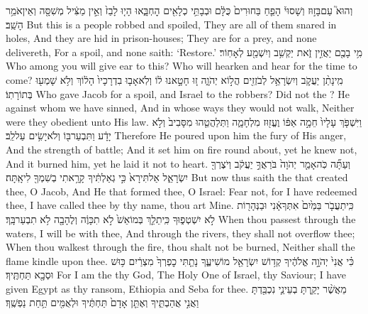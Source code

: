 {וְהוּא֮ עַם\maqqaf בָּז֣וּז וְשָׁסוּי֒ הָפֵ֤חַ בַּחוּרִים֙ כֻּלָּ֔ם וּבְבָתֵּ֥י כְלָאִ֖ים הׇחְבָּ֑אוּ הָי֤וּ לָבַז֙ וְאֵ֣ין מַצִּ֔יל מְשִׁסָּ֖ה וְאֵין\maqqaf אֹמֵ֥ר הָשַֽׁב׃}
{But this is a people robbed and spoiled, They are all of them snared in holes, And they are hid in prison-houses; They are for a prey, and none delivereth, For a spoil, and none saith: ‘Restore.’}
{מִ֥י בָכֶ֖ם יַאֲזִ֣ין זֹ֑את יַקְשִׁ֥ב וְיִשְׁמַ֖ע לְאָחֽוֹר׃}
{Who among you will give ear to this? Who will hearken and hear for the time to come?}
{מִֽי\maqqaf נָתַ֨ן  יַעֲקֹ֛ב וְיִשְׂרָאֵ֥ל לְבֹזְזִ֖ים הֲל֣וֹא יְהֹוָ֑ה ז֚וּ חָטָ֣אנוּ ל֔וֹ וְלֹֽא\maqqaf אָב֤וּ בִדְרָכָיו֙ הָל֔וֹךְ וְלֹ֥א שָׁמְע֖וּ בְּתוֹרָתֽוֹ׃}
{Who gave Jacob for a spoil, and Israel to the robbers? Did not the \lord? He against whom we have sinned, And in whose ways they would not walk, Neither were they obedient unto His law.}
{וַיִּשְׁפֹּ֤ךְ עָלָיו֙ חֵמָ֣ה אַפּ֔וֹ וֶעֱז֖וּז מִלְחָמָ֑ה וַתְּלַהֲטֵ֤הוּ מִסָּבִיב֙ וְלֹ֣א יָדָ֔ע וַתִּבְעַר\maqqaf בּ֖וֹ וְלֹא\maqqaf יָשִׂ֥ים עַל\maqqaf לֵֽב׃}
{Therefore He poured upon him the fury of His anger, And the strength of battle; And it set him on fire round about, yet he knew not, And it burned him, yet he laid it not to heart.}
\newperek
{}
{וְעַתָּ֞ה כֹּֽה\maqqaf אָמַ֤ר יְהֹוָה֙ בֹּרַאֲךָ֣ יַעֲקֹ֔ב וְיֹצֶרְךָ֖ יִשְׂרָאֵ֑ל אַל\maqqaf תִּירָא֙ כִּ֣י גְאַלְתִּ֔יךָ קָרָ֥אתִי בְשִׁמְךָ֖ לִי\maqqaf אָֽתָּה׃}
{But now thus saith the \lord\space that created thee, O Jacob, And He that formed thee, O Israel: Fear not, for I have redeemed thee, I have called thee by thy name, thou art Mine.}
{כִּֽי\maqqaf תַעֲבֹ֤ר בַּמַּ֙יִם֙ אִתְּךָ\maqqaf אָ֔נִי וּבַנְּהָר֖וֹת לֹ֣א יִשְׁטְפ֑וּךָ כִּֽי\maqqaf תֵלֵ֤ךְ בְּמוֹ\maqqaf אֵשׁ֙ לֹ֣א תִכָּוֶ֔ה וְלֶהָבָ֖ה לֹ֥א תִבְעַר\maqqaf בָּֽךְ׃}
{When thou passest through the waters, I will be with thee, And through the rivers, they shall not overflow thee; When thou walkest through the fire, thou shalt not be burned, Neither shall the flame kindle upon thee.}
{כִּ֗י אֲנִי֙ יְהֹוָ֣ה אֱלֹהֶ֔יךָ קְד֥וֹשׁ יִשְׂרָאֵ֖ל מוֹשִׁיעֶ֑ךָ נָתַ֤תִּי כׇפְרְךָ֙ מִצְרַ֔יִם כּ֥וּשׁ וּסְבָ֖א תַּחְתֶּֽיךָ׃}
{For I am the \lord\space thy God, The Holy One of Israel, thy Saviour; I have given Egypt as thy ransom, Ethiopia and Seba for thee.}
{מֵאֲשֶׁ֨ר יָקַ֧רְתָּ בְעֵינַ֛י נִכְבַּ֖דְתָּ וַאֲנִ֣י אֲהַבְתִּ֑יךָ וְאֶתֵּ֤ן אָדָם֙ תַּחְתֶּ֔יךָ וּלְאֻמִּ֖ים תַּ֥חַת נַפְשֶֽׁךָ׃}
